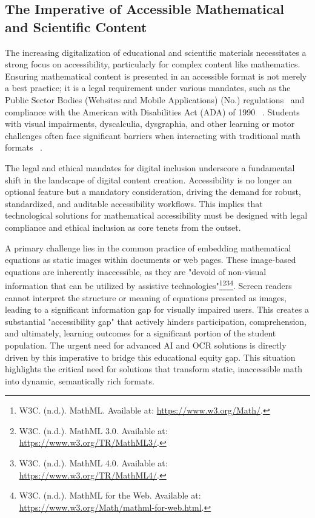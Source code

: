 \subsection{The Imperative of Accessible Mathematical and Scientific Content}\label{subsec:imperative-accessible-math}
The increasing digitalization of educational and scientific materials necessitates a strong focus on accessibility, particularly for complex content like mathematics. Ensuring mathematical content is presented in an accessible format is not merely a best practice; it is a legal requirement under various mandates, such as the Public Sector Bodies (Websites and Mobile Applications) (No.) regulations~ \cite{PublicSectorBodiesRegulations2018} and compliance with the American with Disabilities Act (ADA) of 1990~ \cite{ADA1990}. Students with visual impairments, dyscalculia, dysgraphia, and other learning or motor challenges often face significant barriers when interacting with traditional math formats~ \cite{TexthelpEquatio, TexthelpEquatioPricing, ASUImageAccessibilityGenerator, PerkinsMathKicker, Modmath, UWAccessibleMath}.

The legal and ethical mandates for digital inclusion underscore a fundamental shift in the landscape of digital content creation. Accessibility is no longer an optional feature but a mandatory consideration, driving the demand for robust, standardized, and auditable accessibility workflows. This implies that technological solutions for mathematical accessibility must be designed with legal compliance and ethical inclusion as core tenets from the outset.

A primary challenge lies in the common practice of embedding mathematical equations as static images within documents or web pages. These image-based equations are inherently inaccessible, as they are "devoid of non-visual information that can be utilized by assistive technologies"\footnote{W3C. (n.d.). MathML. Available at: \url{https://www.w3.org/Math/}.}\footnote{W3C. (n.d.). MathML 3.0. Available at: \url{https://www.w3.org/TR/MathML3/}.}\footnote{W3C. (n.d.). MathML 4.0. Available at: \url{https://www.w3.org/TR/MathML4/}.}\footnote{W3C. (n.d.). MathML for the Web. Available at: \url{https://www.w3.org/Math/mathml-for-web.html}.}. Screen readers cannot interpret the structure or meaning of equations presented as images, leading to a significant information gap for visually impaired users. This creates a substantial "accessibility gap" that actively hinders participation, comprehension, and ultimately, learning outcomes for a significant portion of the student population. The urgent need for advanced AI and OCR solutions is directly driven by this imperative to bridge this educational equity gap. This situation highlights the critical need for solutions that transform static, inaccessible math into dynamic, semantically rich formats.

